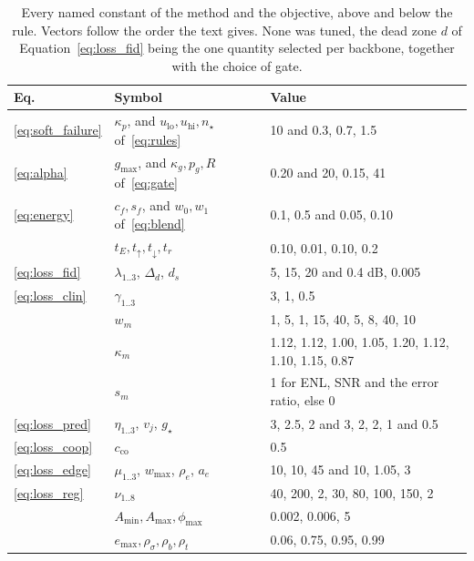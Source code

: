 \begin{table}[!tb]
\centering
\caption{Every named constant of the method and the objective, above and below the rule. Vectors
follow the order the text gives. None was tuned, the dead zone $d$ of Equation~\eqref{eq:loss_fid}
being the one quantity selected per backbone, together with the choice of gate.}
\label{tab:objconst}
\setlength{\tabcolsep}{3pt}
\setlength{\aboverulesep}{0pt}
\setlength{\belowrulesep}{0pt}
\renewcommand{\arraystretch}{0.95}
\scriptsize
\begin{tabular}{llp{}}
\toprule
Eq. & Symbol & Value \\
\midrule
\eqref{eq:soft_failure} & $\kappa_p$, and $u_{\mathrm{lo}}, u_{\mathrm{hi}}, n_\star$ of~\eqref{eq:rules} & 10 and 0.3, 0.7, 1.5 \\
\eqref{eq:alpha} & $g_{\max}$, and $\kappa_g, p_g, R$ of~\eqref{eq:gate} & 0.20 and 20, 0.15, 41 \\
\eqref{eq:energy} & $c_f, s_f$, and $w_0, w_1$ of~\eqref{eq:blend} & 0.1, 0.5 and 0.05, 0.10 \\
 & $t_E, t_\uparrow, t_\downarrow, t_r$ & 0.10, 0.01, 0.10, 0.2 \\
\midrule
\eqref{eq:loss_fid} & $\lambda_{1..3}$, $\Delta_d$, $d_s$ & 5, 15, 20 and 0.4 dB, 0.005 \\
\eqref{eq:loss_clin} & $\gamma_{1..3}$ & 3, 1, 0.5 \\
 & $w_m$ & 1, 5, 1, 15, 40, 5, 8, 40, 10 \\
 & $\kappa_m$ & 1.12, 1.12, 1.00, 1.05, 1.20, 1.12, 1.10, 1.15, 0.87 \\
 & $s_m$ & 1 for ENL, SNR and the error ratio, else 0 \\
\eqref{eq:loss_pred} & $\eta_{1..3}$, $v_j$, $g_\star$ & 3, 2.5, 2 and 3, 2, 2, 1 and 0.5 \\
\eqref{eq:loss_coop} & $c_{\mathrm{co}}$ & 0.5 \\
\eqref{eq:loss_edge} & $\mu_{1..3}$, $w_{\max}$, $\rho_e$, $a_e$ & 10, 10, 45 and 10, 1.05, 3 \\
\eqref{eq:loss_reg} & $\nu_{1..8}$ & 40, 200, 2, 30, 80, 100, 150, 2 \\
 & $A_{\min}, A_{\max}, \phi_{\max}$ & 0.002, 0.006, 5 \\
 & $e_{\max}, \rho_\sigma, \rho_b, \rho_t$ & 0.06, 0.75, 0.95, 0.99 \\
\bottomrule
\end{tabular}
\end{table}

